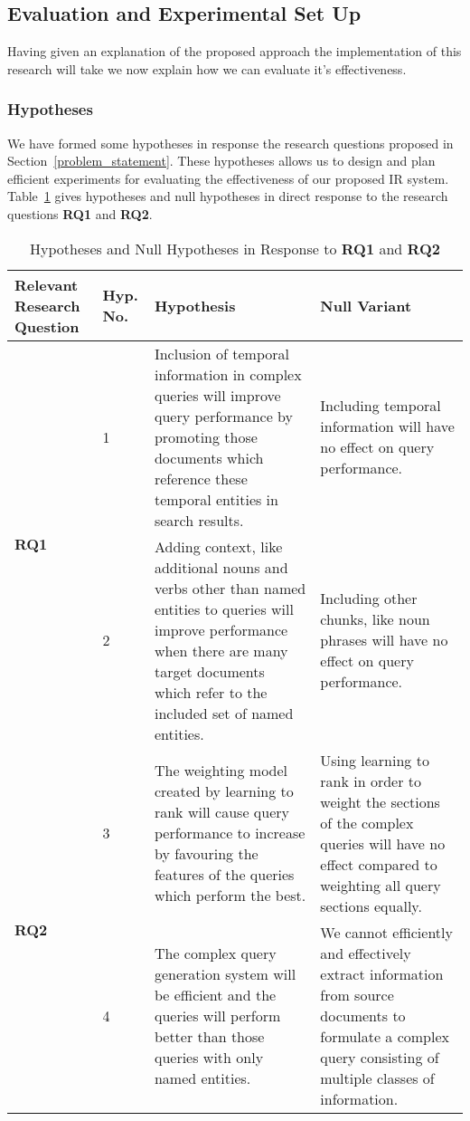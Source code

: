 \documentclass{mprop}
\begin{document}

\subsection{Evaluation and Experimental Set Up}\label{proposed_approach.evaluation}
Having given an explanation of the proposed approach the implementation of this research will take we now explain how we can evaluate it's effectiveness.

\subsubsection{Hypotheses}
We have formed some hypotheses in response the research questions proposed in Section~\ref{problem_statement}. 
These hypotheses allows us to design and plan efficient experiments for evaluating the effectiveness of our proposed IR system.
Table~\ref{hypotheses.table} gives hypotheses and null hypotheses in direct response to the research questions \textbf{RQ1} and \textbf{RQ2}.

\begin{table}[H]
\centering
\begin{tabular}{|p{2cm}|p{1cm}|p{6cm}|p{6cm}|}
\hline
Relevant Research Question  & Hyp. No.  & Hypothesis & Null Variant     \\ \hline
\multirow{2}{*}{\textbf{RQ1}} & 1 & Inclusion of temporal information in complex queries will improve query performance by promoting those documents which reference these temporal entities in search results. & Including temporal information will have no effect on query performance.\\ \cline{2-4}
& 2 & Adding context, like additional nouns and verbs other than named entities to queries will improve performance when there are many target documents which refer to the included set of named entities. & Including other chunks, like noun phrases will have no effect on query performance. \\ \cline{1-4}
\multirow{2}{*}{\textbf{RQ2}} & 3 & The weighting model created by learning to rank will cause query performance to increase by favouring the features of the queries which perform the best. & Using learning to rank in order to weight the sections of the complex queries will have no effect compared to weighting all query sections equally. \\ \cline{2-4}
& 4 & The complex query generation system will be efficient and the queries will perform better than those queries with only named entities. & We cannot efficiently and effectively extract information from source documents to formulate a complex query consisting of multiple classes of information. \\ \cline{1-4}
\end{tabular}
\caption{Hypotheses and Null Hypotheses in Response to \textbf{RQ1} and \textbf{RQ2}}
\label{hypotheses.table}
\end{table}
\end{document}
